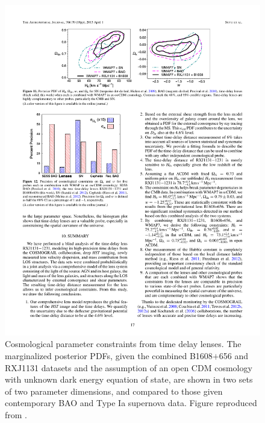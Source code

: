 \begin{figure}[!ht]
\centering\includegraphics[width=0.9\linewidth]{figures/Suyu13_fig11.pdf}
\caption{Cosmological parameter constraints from time delay
lenses. The marginalized posterior PDFs, given the combined B1608$+$656
and RXJ1131 datasets and the assumption of an open CDM cosmology with
unknown dark energy equation of state, are shown in
two sets of two parameter dimensions,
and compared to those given contemporary BAO and Type Ia supernova data.
Figure reproduced from \citet{Suy++13}.}
\label{fig:current-constraints}
\end{figure}

